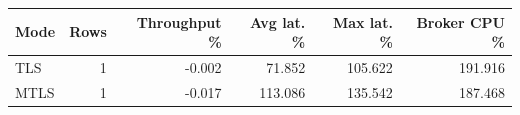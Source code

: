 \begin{tabular}{lrrrrr}
\hline
Mode & Rows & Throughput \% & Avg lat. \% & Max lat. \% & Broker CPU \% \\
\hline
TLS & 1 & -0.002 & 71.852 & 105.622 & 191.916 \\
MTLS & 1 & -0.017 & 113.086 & 135.542 & 187.468 \\
\hline
\end{tabular}
